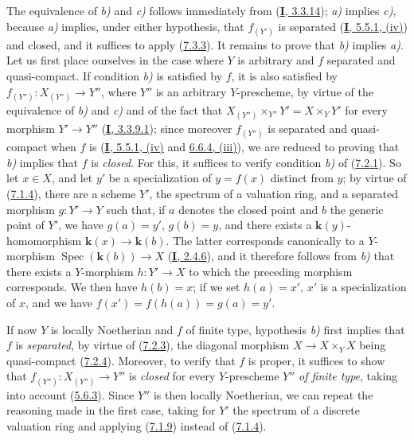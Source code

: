 The equivalence of \emph{b)} and \emph{c)} follows immediately from
(\hyperref[I.3.3.14]{\textbf{I}, 3.3.14}); \emph{a)} implies \emph{c)}, because \emph{a)} implies, under
either hypothesis, that $f_{(Y')}$ is separated
(\hyperref[I.5.5.1]{\textbf{I}, 5.5.1, (iv)}) and closed, and it suffices to apply
(\hyperref[II.7.3.3]{7.3.3}). It remains to prove that \emph{b)} implies \emph{a)}.
Let us first place ourselves in the case where $Y$ is arbitrary and $f$
separated and quasi-compact. If condition \emph{b)} is satisfied by $f$, it is also
satisfied by $f_{(Y'')}:X_{(Y'')}\to Y''$, where $Y''$ is an arbitrary
$Y$-prescheme, by virtue of the equivalence of \emph{b)} and \emph{c)} and of the fact that
$X_{(Y'')}\times_{Y''}Y'=X\times_YY'$ for every morphism $Y'\to Y''$
(\hyperref[I.3.3.9.1]{\textbf{I}, 3.3.9.1}); since moreover $f_{(Y'')}$ is
separated and quasi-compact when $f$ is
(\hyperref[I.5.5.1]{\textbf{I}, 5.5.1, (iv)} and
\hyperref[I.6.6.4]{6.6.4, (iii)}), we are reduced to proving that \emph{b)} implies
that $f$ is \emph{closed}. For this, it suffices to verify condition \emph{b)} of
(\hyperref[II.7.2.1]{7.2.1}). So let $x\in X$, and let $y'$ be a
specialization of $y=f(x)$ distinct from $y$; by virtue of
(\hyperref[II.7.1.4]{7.1.4}), there are a scheme $Y'$, the spectrum of a
valuation ring, and a separated morphism $g:Y'\to Y$ such that, if $a$
denotes the closed point and $b$ the generic point of $Y'$, we have
$g(a)=y'$, $g(b)=y$, and there exists a $\boldsymbol{k}(y)$-homomorphism
$\boldsymbol{k}(x)\to \boldsymbol{k}(b)$. The latter corresponds canonically to a $Y$-morphism
$\operatorname{Spec}(\boldsymbol{k}(b))\to X$
(\hyperref[I.2.4.6]{\textbf{I}, 2.4.6}), and it therefore follows from \emph{b)} that there
exists a $Y$-morphism $h:Y'\to X$ to which the preceding morphism
corresponds. We then have $h(b)=x$; if we set $h(a)=x'$, $x'$ is a
specialization of $x$, and we have $f(x')=f(h(a))=g(a)=y'$.

If now $Y$ is locally Noetherian and $f$ of finite type, hypothesis \emph{b)}
first implies that $f$ is \emph{separated}, by virtue of
(\hyperref[II.7.2.3]{7.2.3}), the diagonal morphism $X\to X\times_YX$
being quasi-compact (\hyperref[II.7.2.4]{7.2.4}). Moreover, to verify
that $f$ is proper, it suffices to show that $f_{(Y'')}:X_{(Y'')}\to Y''$ is
\emph{closed} for every $Y$-prescheme $Y''$ \emph{of finite type}, taking into
account (\hyperref[II.5.6.3]{5.6.3}). Since $Y''$ is then locally
Noetherian, we can repeat the reasoning made in the first case, taking for
$Y'$ the spectrum of a discrete valuation ring and applying
(\hyperref[II.7.1.9]{7.1.9}) instead of
(\hyperref[II.7.1.4]{7.1.4}).

